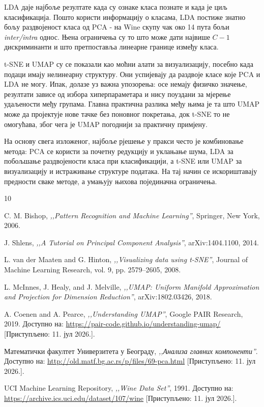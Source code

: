 \documentclass{article}
\begin{document}
	LDA даје најбоље резултате када су ознаке класа познате и када је циљ класификација. Пошто користи информацију о класама, LDA постиже знатно бољу раздвојеност класа од PCA - на Wine скупу чак око 14 пута бољи \textit{inter/intra} однос. Њена ограничења су то што може дати највише $C-1$ дискриминанти и што претпоставља линеарне границе између класа.
	
	t-SNE и UMAP су се показали као моћни алати за визуализацију, посебно када подаци имају нелинеарну структуру. Они успијевају да раздвоје класе које PCA и LDA не могу. Ипак, долазе уз важна упозорења: осе немају физичко значење, резултати зависе од избора хиперпараметара и нису поуздани за мјерење удаљености међу групама. Главна практична разлика међу њима је та што UMAP може да пројектује нове тачке без поновног покретања, док t-SNE то не омогућава, због чега је UMAP погоднији за практичну примјену.
	
	На основу свега изложеног, најбоље рјешење у пракси често је комбиновање метода: PCA се користи за почетну редукцију и уклањање шума, LDA за побољшање раздвојености класа при класификацији, а t-SNE или UMAP за визуализацију и истраживање структуре података. На тај начин се искориштавају предности сваке методе, а умањују њихова појединачна ограничења.
	
	
	\pagebreak
	\begin{thebibliography}{10}

		C. M. Bishop, \textit{,,Pattern Recognition and Machine Learning''}, Springer, New York, 2006.

		J. Shlens, \textit{,,A Tutorial on Principal Component Analysis''}, arXiv:1404.1100, 2014.

		L. van der Maaten and G. Hinton, \textit{,,Visualizing data using t-SNE''}, Journal of Machine Learning Research, vol. 9, pp. 2579--2605, 2008.

		L. McInnes, J. Healy, and J. Melville, \textit{,,UMAP: Uniform Manifold Approximation and Projection for Dimension Reduction''}, arXiv:1802.03426, 2018.

		A. Coenen and A. Pearce, \textit{,,Understanding UMAP''}, Google PAIR Research, 2019. Доступно на: \url{https://pair-code.github.io/understanding-umap/} [Приступљено: 11. јул 2026.].

		Математички факултет Универзитета у Београду, \textit{,,Анализа главних компоненти''}. Доступно на: \url{http://old.matf.bg.ac.rs/p/files/69-pca.html} [Приступљено: 11. јул 2026.].

		UCI Machine Learning Repository, \textit{,,Wine Data Set''}, 1991. Доступно на: \url{https://archive.ics.uci.edu/dataset/107/wine} [Приступљено: 11. јул 2026.].

	\end{thebibliography}
	
\end{document}

